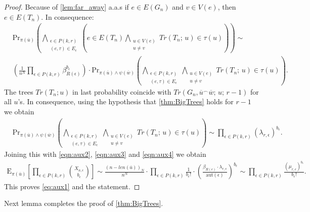 \documentclass[12pt,notitlepage,a4paper]{article}
\theoremstyle{definition}
\newcommand{\aut}{\mathrm{aut}}
\begin{document}
\begin{proof}
	Because of \cref{lem:far_away} a.a.s if $e\in E(G_n)$
	and $v\in V(e)$, then $e\in E(T_n)$. In consequence:
	\begin{align} \label{eqn:aux4}
	&\mathrm{Pr}_{\pi(\overline{u})}\left(
	\bigwedge_{\substack{
			\epsilon\in P(k,r)\\
			(e, \tau)\in E_{\epsilon}
	}} \left(
	e\in E(T_n) \bigwedge_{\substack{
			u\in V(e)\\
			u\neq v}} Tr(T_n;\, u)
	\in \tau(u)		
	\right)
	\right)\sim\\ \nonumber
	&
	\left(\frac{1}{n^N}
	\prod_{\epsilon\in
	P(k,r)} \beta_{R(\epsilon)}^{b_\epsilon}\right)
	\cdot 		
	\mathrm{Pr}_{\pi(\overline{u})\wedge \psi(\overline{w})}\left(
	\bigwedge_{\substack{
			\epsilon\in P(k,r)\\
			(e, \tau)\in E_{\epsilon}
	}} 
	\bigwedge_{\substack{
		u\in V(e)\\
		u\neq v
	}}Tr(T_n;\, u)\in \tau(u)	
	\right).
	\end{align}
	The trees $Tr(T_n;u)$ in last probability
	coincide with 
	$Tr(G_n,\overline{u}^\smallfrown\overline{w};\,u;\, r-1)$
	for all $u$'s.
	In consequence, using the hypothesis that \cref{thm:BigTrees}
	holds for $r-1$ we obtain
	\begin{align*}
	&	\mathrm{Pr}_{\pi(\overline{u})\wedge \psi(\overline{w})}
	\left(
	\bigwedge_{\substack{
			\epsilon\in P(k,r)\\
			(e, \tau)\in E_{\epsilon}
	}} 
	\bigwedge_{\substack{
			u\in V(e)\\
			u\neq v
	}}Tr(T_n;\, u)\in \tau(u)	
	\right) \sim
	 \prod_{\epsilon\in P(k,r)} (\lambda_{r,\epsilon})^{b_\epsilon}.
	\end{align*}
	Joining this with \cref{eqn:aux2},
	\cref{eqn:aux3} and \cref{eqn:aux4} we obtain 
	\begin{align*} 
	\mathrm{E}_{\pi(\overline{u})}
	\left[
	\prod_{\epsilon\in P(k,r)} \binom{X_{n,\epsilon}}{b_\epsilon}	
	\right]
	\sim   
	\frac{(n-len(\overline{u}))_{N}}
	{n^{N}}
	\cdot
	\prod_{\epsilon\in P(k,r)}
	\frac{1}{b_\epsilon!} \cdot
	\left( \frac{\beta_{R(\epsilon)}\cdot \lambda_{r,\epsilon}
	}{\aut(\epsilon)} \right)^
	{b_\epsilon} \sim \prod_{\epsilon\in P(k,r)}
	\frac{\left( \mu_{r,\epsilon} \right)^
		{b_\epsilon}}{b_\epsilon!}.
	\end{align*}
	This proves \cref{eq:aux1} and the statement. 	
\end{proof}

Next lemma completes the proof of \cref{thm:BigTrees}.
\end{document}
